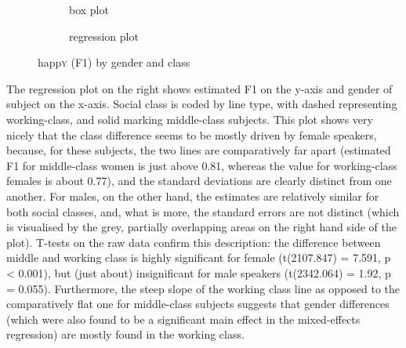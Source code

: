 	\begin{figure}[h!]
		\centering
		\begin{subfigure}{.49\textwidth}
			\centering
			\resizebox{\linewidth}{!}{} 
			\caption{box plot}
			\label{fig.box.f1w.happy.genderclass}
		\end{subfigure}
		\begin{subfigure}{.49\textwidth}
			\centering
			\resizebox{\linewidth}{!}{}
			\caption{regression plot}
			\label{fig.scatter.f1w.happy.genderclass}
		\end{subfigure}
		\caption{happ\textsc{y} (F1) by gender and class}
	\end{figure}

The regression plot on the right shows estimated F1 on the y-axis and gender of subject on the x-axis.
Social class is coded by line type, with dashed representing working-class, and solid marking middle-class subjects.
This plot shows very nicely that the class difference seems to be mostly driven by female speakers, because, for these subjects, the two lines are comparatively far apart (estimated F1 for middle-class women is just above 0.81, whereas the value for working-class females is about 0.77), and the standard deviations are clearly distinct from one another.
For males, on the other hand, the estimates are relatively similar for both social classes, and, what is more, the standard errors are not distinct (which is visualised by the grey, partially overlapping areas on the right hand side of the plot).
T-tests on the raw data confirm this description: the difference between middle and working class is highly significant for female (t(2107.847) = 7.591, p < 0.001), but (just about) insignificant for male speakers (t(2342.064) = 1.92, p = 0.055).
Furthermore, the steep slope of the working class line as opposed to the comparatively flat one for middle-class subjects suggests that gender differences (which were also found to be a significant main effect in the mixed-effects regression) are mostly found in the working class.

